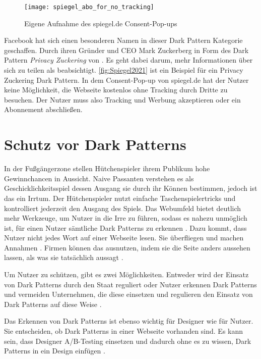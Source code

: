 \documentclass[conference,compsoc,final,a4paper]{IEEEtran}
\begin{document}
\begin{figure}[!ht]
  \centering
  \texttt{[image: spiegel\_abo\_for\_no\_tracking]}
  \caption{Eigene Aufnahme des spiegel.de Consent-Pop-ups~\autocite{Spiegel2021}}
  \label{fig:Spiegel2021}
\end{figure}

Facebook hat sich einen besonderen Namen in dieser Dark Pattern Kategorie geschaffen. Durch ihren Gründer und CEO Mark Zuckerberg in Form des Dark Pattern \textit{Privacy Zuckering} von \citeauthor{Brignull} \autocite{Brignull}. Es geht dabei darum, mehr Informationen über sich zu teilen als beabsichtigt. \autoref{fig:Spiegel2021} ist ein Beispiel für ein Privacy Zuckering Dark Pattern. In dem Consent-Pop-up von spiegel.de hat der Nutzer keine Möglichkeit, die Webseite kostenlos ohne Tracking durch Dritte zu besuchen. Der Nutzer muss also Tracking und Werbung akzeptieren oder ein Abonnement abschließen. 


\section{Schutz vor Dark Patterns}
In der Fußgängerzone stellen Hütchenspieler ihrem Publikum hohe Gewinnchancen in Aussicht. Naive Passanten verstehen es als Geschicklichkeitsspiel dessen Ausgang sie durch ihr Können bestimmen, jedoch ist das ein Irrtum. Der Hütchenspieler nutzt einfache Taschenspielertricks und kontrolliert jederzeit den Ausgang des Spiels. Das Webumfeld bietet deutlich mehr Werkzeuge, um Nutzer in die Irre zu führen, sodass es nahezu unmöglich ist, für einen Nutzer sämtliche Dark Patterns zu erkennen \autocite{M.Bhoot2020}. Dazu kommt, dass Nutzer nicht jedes Wort auf einer Webseite lesen. Sie überfliegen und machen Annahmen \autocite{Brignull}. Firmen können das ausnutzen, indem sie die Seite anders aussehen lassen, als was sie tatsächlich aussagt \autocite{Brignull}.

Um Nutzer zu schützen, gibt es zwei Möglichkeiten. Entweder wird der Einsatz von Dark Patterns durch den Staat reguliert oder Nutzer erkennen Dark Patterns und vermeiden Unternehmen, die diese einsetzen und regulieren den Einsatz von Dark Patterns auf diese Weise \autocite{Narayanan2020}.

Das Erkennen von Dark Patterns ist ebenso wichtig für Designer wie für Nutzer. Sie entscheiden, ob Dark Patterns in einer Webseite vorhanden sind. Es kann sein, dass Designer A/B-Testing einsetzen und dadurch ohne es zu wissen, Dark Patterns in ein Design einfügen \autocite{Narayanan2020}.
\end{document}
